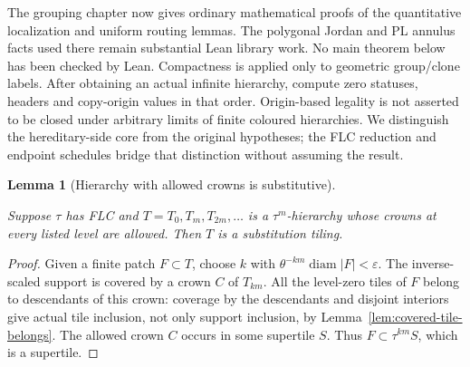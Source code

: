 \documentclass[11pt,a4paper]{article}
\newtheorem{lemma}[definition]{Lemma}
\theoremstyle{remark}
\newcommand{\lean}[1]{}
\newcommand{\uses}[1]{}
\begin{document}
The grouping chapter now gives ordinary mathematical proofs of the
quantitative localization and uniform routing lemmas. The polygonal Jordan
and PL annulus facts used there remain substantial Lean library work.
No main theorem below has been checked by Lean. Compactness is applied only
to geometric group/clone labels. After obtaining an actual infinite
hierarchy, compute zero statuses, headers and copy-origin values in that
order. Origin-based legality is not asserted to be closed under arbitrary
limits of finite coloured hierarchies. We distinguish the
hereditary-side core from the original hypotheses; the FLC reduction and
endpoint schedules bridge that distinction without assuming the result.

\begin{lemma}[Hierarchy with allowed crowns is substitutive]
\label{lem:allowed-hierarchy}
\lean{Tilings.allowed_crowns_hierarchy_is_substitutive}
\uses{def:hierarchy,def:flc,lem:crown-cover-plane}
Suppose $\tau$ has FLC and $T=T_0,T_m,T_{2m},\ldots$ is a $\tau^m$-hierarchy
whose crowns at every listed level are allowed. Then $T$ is a substitution
tiling.
\end{lemma}
\begin{proof}
Given a finite patch $F\subset T$, choose $k$ with
$\theta^{-km}\operatorname{diam}|F|<\varepsilon$.
The inverse-scaled support is covered by a crown $C$ of $T_{km}$.
All the level-zero tiles of $F$ belong to descendants of this crown:
coverage by the descendants and disjoint interiors give actual tile
inclusion, not only support inclusion, by
Lemma~\ref{lem:covered-tile-belongs}. The allowed crown $C$ occurs in
some supertile $S$. Thus $F\subset\tau^{km}S$, which is a supertile.
\end{proof}
\end{document}
